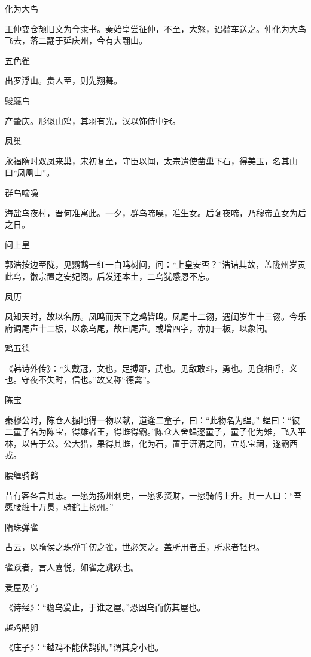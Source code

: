 \documentclass[a4paper,12pt,UTF8,twoside]{ctexbook}
\begin{document}
    化为大鸟
    
    王仲变仓颉旧文为今隶书。秦始皇尝征仲，不至，大怒，诏槛车送之。仲化为大鸟飞去，落二翮于延庆州，今有大翮山。
    
    五色雀
    
    出罗浮山。贵人至，则先翔舞。
    
    鵔鸃乌
    
    产肇庆。形似山鸡，其羽有光，汉以饰侍中冠。
    
    凤巢
    
    永福隋时双凤来巢，宋初复至，守臣以闻，太宗遣使凿巢下石，得美玉，名其山曰“凤凰山”。
    
    群乌啼噪
    
    海盐乌夜村，晋何准寓此。一夕，群乌啼噪，准生女。后复夜啼，乃穆帝立女为后之日。
    
    问上皇
    
    郭浩按边至陇，见鹦鹉一红一白鸣树间，问：“上皇安否？”浩诘其故，盖陇州岁贡此鸟，徽宗置之安妃阁。后发还本土，二鸟犹感恩不忘。
    
    凤历
    
    凤知天时，故以名历。凤鸣而天下之鸡皆鸣。凤尾十二翎，遇闰岁生十三翎。今乐府调尾声十二板，以象鸟尾，故曰尾声。或增四字，亦加一板，以象闰。
    
    鸡五德
    
    《韩诗外传》：“头戴冠，文也。足搏距，武也。见敌敢斗，勇也。见食相呼，义也。守夜不失时，信也。”故又称“德禽”。
    
    陈宝
    
    秦穆公时，陈仓人掘地得一物以献，道逢二童子，曰：“此物名为蝹。” 蝹曰：“彼二童子名为陈宝，得雄者王，得雌得霸。”陈仓人舍蝹逐童子，童子化为雉，飞入平林，以告于公。公大猎，果得其雌，化为石，置于汧渭之间，立陈宝祠，遂霸西戎。
    
    腰缠骑鹤
    
    昔有客各言其志。一愿为扬州刺史，一愿多资财，一愿骑鹤上升。其一人曰：“吾愿腰缠十万贯，骑鹤上扬州。”
    
    隋珠弹雀
    
    古云，以隋侯之珠弹千仞之雀，世必笑之。盖所用者重，所求者轻也。
    
    雀跃者，言人喜悦，如雀之跳跃也。
    
    爱屋及乌
    
    《诗经》：“瞻乌爰止，于谁之屋。”恐因乌而伤其屋也。
    
    越鸡鹄卵
    
    《庄子》：“越鸡不能伏鹄卵。”谓其身小也。
    
\end{document}
